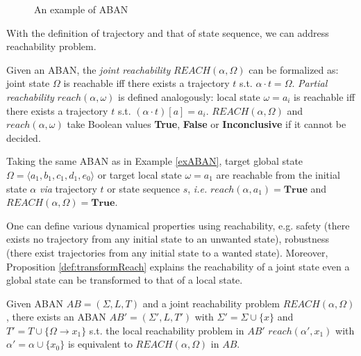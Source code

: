 \begin{figure}[ht]
\centering

\caption[Example of ABAN]{An example of ABAN}\label{fig:exampleABAN}
\end{figure}

With the definition of trajectory and that of state sequence, we can address reachability problem.

\begin{definition}
Given an ABAN, the \textit{joint reachability} $REACH (\alpha,\Omega)$ can be formalized as: joint state $\Omega$ is reachable iff there exists a trajectory $t$ s.t. $\alpha\cdot t=\Omega$.
\textit{Partial reachability} $reach(\alpha,\omega)$ is defined analogously: local state $\omega=a_i$ is reachable iff there exists a trajectory $t$ s.t. $(\alpha\cdot t)[a]=a_i$.
$REACH (\alpha,\Omega)$ and $reach(\alpha,\omega)$ take Boolean values \textbf{True}, \textbf{False} or \textbf{Inconclusive} if it cannot be decided.
\end{definition}

\begin{example}
Taking the same ABAN as in Example \ref{exABAN}, target global state $\Omega=\langle a_1,b_1,c_1,d_1,e_0\rangle$ or target local state $\omega=a_1$ are reachable from the initial state $\alpha$ \textit{via} trajectory $t$ or state sequence $s$, \textit{i.e.} $reach(\alpha,a_1)=\textbf{True}$ and $REACH(\alpha,\Omega)=\textbf{True}$. 
\end{example}

One can define various dynamical properties using reachability, e.g. safety (there exists no trajectory from any initial state to an unwanted state), robustness (there exist trajectories from any initial state to a wanted state).
Moreover, Proposition \ref{def:transformReach} explains the reachability of a joint state even a global state can be transformed to that of a local state.

\begin{proposition}\label{def:transformReach}
Given ABAN $AB=(\Sigma, L, T)$ and a joint reachability problem $REACH(\alpha,\Omega)$, there exists an ABAN $AB'=(\Sigma', L, T')$ with $\Sigma'=\Sigma\cup\{x\}$ and $T'=T\cup\{\Omega\to x_1\}$ s.t. the local reachability problem in $AB'$ $reach(\alpha', x_1)$ with $\alpha'=\alpha\cup\{x_0\}$ is equivalent to $REACH(\alpha,\Omega)$ in $AB$.
\end{proposition}

